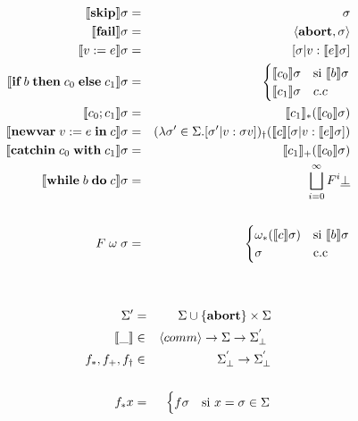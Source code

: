     \begin{multicols}{2}
      \begin{eqnarray*}
        \llbracket\textbf{skip}\rrbracket \sigma &=& \sigma \\
        \llbracket\textbf{fail}\rrbracket \sigma &=& \langle\textbf{abort}, \sigma\rangle \\
        \llbracket v := e\rrbracket \sigma &=& [\sigma | v : \llbracket e\rrbracket \sigma] \\
        \llbracket\textbf{if}\;b\;\textbf{then}\;c_{0}\;\textbf{else}\;c_{1}\rrbracket \sigma &=& \begin{cases}
                                                  \llbracket c_0\rrbracket \sigma & \text{si } \llbracket b\rrbracket \sigma \\
                                                  \llbracket c_1\rrbracket \sigma & c.c \\
                                                \end{cases}\\
        \llbracket c_{0};c_{1}\rrbracket \sigma &=& \llbracket c_{1}\rrbracket_{\ast} (\llbracket c_{0}\rrbracket \sigma) \\
        \llbracket\textbf{newvar}\; v:=e\;\textbf{in}\;c\rrbracket \sigma &=& (\lambda \sigma' \in \Sigma. [\sigma' | v:\sigma v])_{\dag} (\llbracket c\rrbracket[\sigma|v:\llbracket e\rrbracket \sigma]) \\
        \llbracket\textbf{catchin}\;c_{0}\;\textbf{with}\;c_{1}\rrbracket \sigma &=& \llbracket c_{1}\rrbracket_{+} (\llbracket c_{0}\rrbracket \sigma) \\
        \llbracket\textbf{while}\;b\;\textbf{do}\;c\rrbracket \sigma &=& \bigsqcup_{i=0}^{\infty} F^{i} \underline{\bot} \\ \\
        F \;\omega\;\sigma &=& \begin{cases}
                                \omega_{\ast}(\llbracket c\rrbracket \sigma) & \text{si } \llbracket b\rrbracket \sigma \\
                                \sigma & \text{c.c}
                              \end{cases}
      \end{eqnarray*}
      \begin{eqnarray*}
        \\ \\
        \Sigma' &=& \Sigma \cup \{\abort\} \times \Sigma \\
        \semAGU{\_} &\in& \lang{comm} \rightarrow \Sigma \rightarrow \Sigma^{'}_{\bot} \\
        f_{\ast}, f_{+}, f_{\dag} &\in& \Sigma^{'}_{\bot} \rightarrow \Sigma^{'}_{\bot} \\ \\ 
        f_{\ast} x &=& \begin{cases}
                        f \sigma & \text{si } x = \sigma \in \Sigma \\

\end{cases}
\end{eqnarray*}
\end{multicols}
